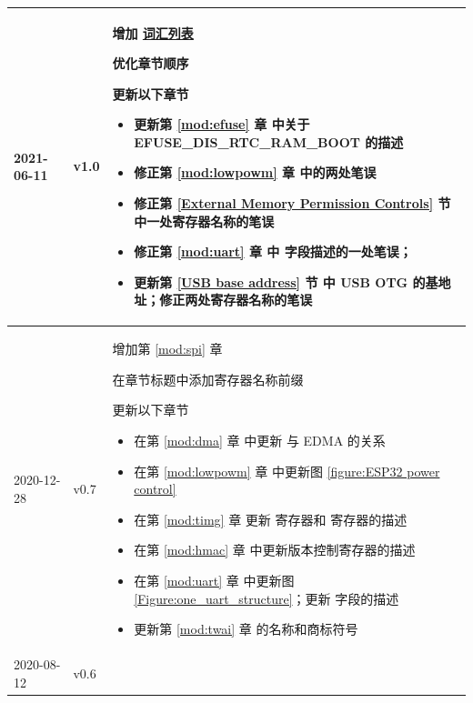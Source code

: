 \begin{longtable}[l]{ | m{2cm} | m{1.5cm} | m{12cm} | }
    2021-06-11 & v1.0 &
    增加 \hyperlink{glossary}{词汇列表}

    优化章节顺序

    更新以下章节
    \begin{itemize}
        \item 更新第 \ref{mod:efuse} 章 \textit{\nameref{mod:efuse}} 中关于 EFUSE\_DIS\_RTC\_RAM\_BOOT 的描述
        \item 修正第 \ref{mod:lowpowm} 章 \textit{\nameref{mod:lowpowm}} 中的两处笔误
        \item 修正第 \ref{External Memory Permission Controls} 节 \textit{\nameref{External Memory Permission Controls}} 中一处寄存器名称的笔误
        \item 修正第 \ref{mod:uart} 章 \textit{\nameref{mod:uart}} 中 \textit{\nameref{fielddesc:LEDCTICKSELTIMERX}} 字段描述的一处笔误；
        \item 更新第 \ref{USB base address} 节 \textit{\nameref{USB base address}} 中 USB OTG 的基地址；修正两处寄存器名称的笔误
    \vspace{-1em}
    \end{itemize}
    \\\hline

    2020-12-28 & v0.7 &
    增加第 \ref{mod:spi} 章 \textit{\nameref{mod:spi}}

    在章节标题中添加寄存器名称前缀

    更新以下章节
    \begin{itemize}
        \item 在第 \ref{mod:dma} 章 \textit{\nameref{mod:dma}} 中更新 \nameref{subsection:dma-crypto} 与 EDMA 的关系
        \item 在第 \ref{mod:lowpowm} 章 \textit{\nameref{mod:lowpowm}} 中更新图 \ref{figure:ESP32 power control}
        \item 在第 \ref{mod:timg} 章\textit{\nameref{mod:timg}} 更新 \nameref{regdesc:TIMGRTCCALICFGREG} 寄存器和 \nameref{regdesc:TIMGRTCCALICFG1REG} 寄存器的描述
        \item 在第 \ref{mod:hmac} 章 \textit{\nameref{mod:hmac}} 中更新版本控制寄存器的描述
        \item 在第 \ref{mod:uart} 章 \textit{\nameref{mod:uart}} 中更新图 \ref{Figure:one_uart_structure}；更新 \nameref{fielddesc:UARTRXDEDGECNT} 字段的描述
        \item 更新第 \ref{mod:twai} 章 \textit{\nameref{mod:twai}} 的名称和商标符号
    \vspace{-1em}
    \end{itemize}
    \\\hline
    2020-08-12 & v0.6 &


\end{longtable}

